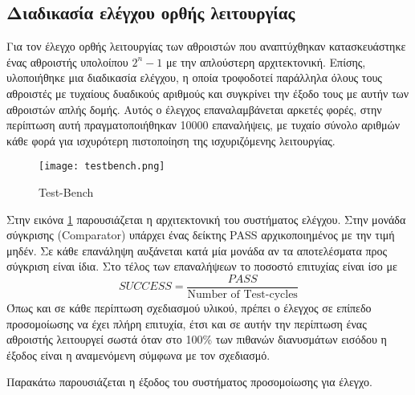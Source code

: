 \clearpage
\subsection{Διαδικασία ελέγχου ορθής λειτουργίας}
Για τον έλεγχο ορθής λειτουργίας των αθροιστών που αναπτύχθηκαν κατασκευάστηκε ένας αθροιστής 
υπολοίπου $2^n-1$ με την απλούστερη αρχιτεκτονική. Επίσης, υλοποιήθηκε μια διαδικασία ελέγχου,
η οποία τροφοδοτεί παράλληλα όλους τους αθροιστές με τυχαίους δυαδικούς αριθμούς και συγκρίνει 
την έξοδο τους με αυτήν των αθροιστών απλής δομής. Αυτός ο έλεγχος επαναλαμβάνεται αρκετές 
φορές, στην περίπτωση αυτή πραγματοποιήθηκαν 10000 επαναλήψεις, με τυχαίο σύνολο αριθμών 
κάθε φορά για ισχυρότερη πιστοποίηση της ισχυριζόμενης λειτουργίας.
\begin{figure}[H]
    \centering
    \texttt{[image: testbench.png]}
    \caption{Test-Bench}
    \label{fig:testbench}
\end{figure}
Στην εικόνα \ref{fig:testbench} παρουσιάζεται η αρχιτεκτονική του συστήματος ελέγχου. Στην 
μονάδα σύγκρισης (Comparator) υπάρχει ένας δείκτης PASS αρχικοποιημένος με την τιμή μηδέν.
Σε κάθε επανάληψη αυξάνεται κατά μία μονάδα αν τα αποτελέσματα προς σύγκριση είναι ίδια.
Στο τέλος των επαναλήψεων το ποσοστό επιτυχίας είναι ίσο με 
\begin{equation*}
    SUCCESS = \frac{PASS}{\text{Number of Test-cycles}}
\end{equation*}
Όπως και σε κάθε περίπτωση σχεδιασμού υλικού, πρέπει ο έλεγχος σε επίπεδο προσομοίωσης να
έχει πλήρη επιτυχία, έτσι και σε αυτήν την περίπτωση ένας αθροιστής λειτουργεί σωστά όταν 
στο 100\% των πιθανών διανυσμάτων εισόδου η έξοδος είναι η αναμενόμενη σύμφωνα με τον σχεδιασμό.

Παρακάτω παρουσιάζεται η έξοδος του συστήματος προσομοίωσης για έλεγχο.



